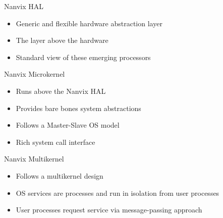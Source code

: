 		\begin{frame}[fragile]{Nanvix HAL}

			\begin{itemize}
				\item Generic and flexible hardware abstraction layer
				\item The layer above the hardware
				\item Standard view of these emerging processors
			\end{itemize}


		\end{frame}

		\begin{frame}[fragile]{Nanvix Microkernel}

			\begin{itemize}
				\item Runs above the Nanvix HAL
				\item Provides bare bones system abstractions
				\item Follows a Master-Slave OS model
				\item Rich system call interface
			\end{itemize}


		\end{frame}

		\begin{frame}[fragile]{Nanvix Multikernel}

			\begin{itemize}
				\item Follows a multikernel design
				\item OS services are processes and run in isolation from user processes
				\item User processes request service via message-passing approach
			\end{itemize}


		\end{frame}

